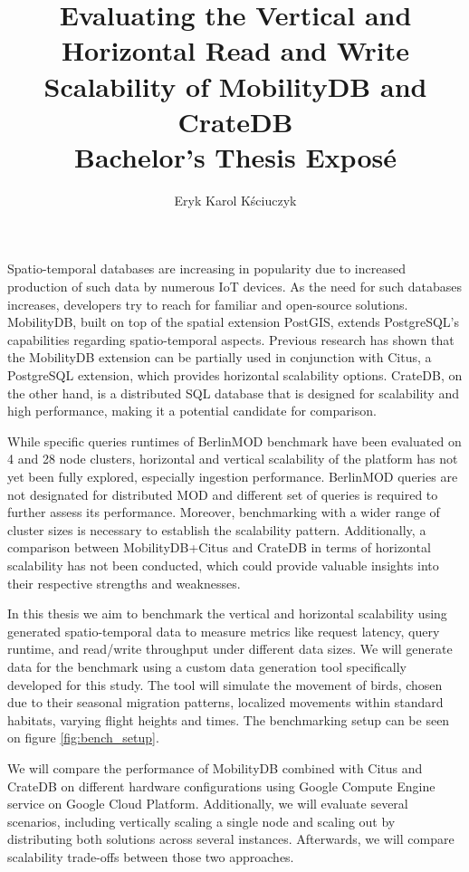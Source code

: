 \documentclass{article}
\title{
	Evaluating the Vertical and Horizontal Read and Write Scalability of 
	MobilityDB and CrateDB
	\\[1ex] \large Bachelor's Thesis Exposé}
\author{Eryk Karol Kściuczyk}
\date{} %
\begin{document}
\maketitle

Spatio-temporal databases are increasing in popularity due to increased
production of such data by numerous IoT devices.
As the need for such databases increases, developers try to reach for 
familiar and open-source solutions.
MobilityDB, built on top of the spatial extension PostGIS, extends PostgreSQL's 
capabilities regarding spatio-temporal aspects.
Previous research has shown that the MobilityDB extension can be partially used
in conjunction with Citus, a PostgreSQL extension, which provides horizontal
scalability options.
CrateDB, on the other hand, is a distributed SQL database that is designed for
scalability and high performance, making it a potential candidate for comparison.

While specific queries runtimes of BerlinMOD benchmark have been 
evaluated on 4 and 28 node clusters,
horizontal and vertical scalability of the platform has not yet been fully
explored, especially ingestion performance.
BerlinMOD queries are not designated for distributed MOD and different set of
queries is required to further assess its performance.
Moreover, benchmarking with a wider range of cluster sizes is necessary to 
establish the scalability pattern.
Additionally, a comparison between MobilityDB+Citus and CrateDB in terms of
horizontal scalability has not been conducted, which could provide valuable
insights into their respective strengths and weaknesses.

In this thesis we aim to benchmark the vertical and horizontal scalability
using generated spatio-temporal data to measure metrics like request 
latency, query runtime, and read/write throughput under different data sizes.
We will generate data for the benchmark using a custom data generation tool
specifically developed for this study.
The tool will simulate the movement of birds, chosen due to their
seasonal migration patterns, localized movements within standard habitats,
varying flight heights and times. The benchmarking setup can be seen on figure
\ref{fig:bench_setup}.

We will compare the performance of MobilityDB combined with Citus and CrateDB on different
hardware configurations using Google Compute Engine service on Google Cloud
Platform.
Additionally, we will evaluate several scenarios, including vertically scaling 
a single node and scaling out by distributing both solutions across several
instances. 
Afterwards, we will compare scalability trade-offs between those two
approaches.
\end{document}
